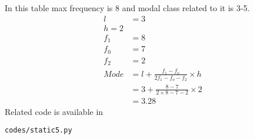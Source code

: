 In this table max frequency is 8 and modal class related to it is 3-5.
\\
\begin{align}
l &= 3
\\
h = 2
\\
f_1 &= 8
\\
f_0 &= 7
\\
f_2 &= 2
\\
Mode &= l+\frac{f_1 - f_o}{2f_1 - f_o - f_2}\times h
\\
&= 3+\frac{8 - 7}{2\times 8 - 7- 2}\times 2
\\
&=3.28
\end{align}
Related code is available in 
\begin{lstlisting}
codes/static5.py
\end{lstlisting}
